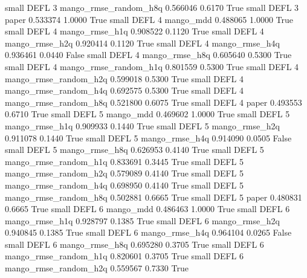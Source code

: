      small     DEFL                 3 mango_rmse_random_h8q   0.566046      0.6170    True
     small     DEFL                 3                 paper   0.533374      1.0000    True
     small     DEFL                 4             mango_mdd   0.488065      1.0000    True
     small     DEFL                 4        mango_rmse_h1q   0.908522      0.1120    True
     small     DEFL                 4        mango_rmse_h2q   0.920414      0.1120    True
     small     DEFL                 4        mango_rmse_h4q   0.936461      0.0440   False
     small     DEFL                 4        mango_rmse_h8q   0.605640      0.5300    True
     small     DEFL                 4 mango_rmse_random_h1q   0.801559      0.5300    True
     small     DEFL                 4 mango_rmse_random_h2q   0.599018      0.5300    True
     small     DEFL                 4 mango_rmse_random_h4q   0.692575      0.5300    True
     small     DEFL                 4 mango_rmse_random_h8q   0.521800      0.6075    True
     small     DEFL                 4                 paper   0.493553      0.6710    True
     small     DEFL                 5             mango_mdd   0.469602      1.0000    True
     small     DEFL                 5        mango_rmse_h1q   0.909933      0.1440    True
     small     DEFL                 5        mango_rmse_h2q   0.911078      0.1440    True
     small     DEFL                 5        mango_rmse_h4q   0.914090      0.0505   False
     small     DEFL                 5        mango_rmse_h8q   0.626953      0.4140    True
     small     DEFL                 5 mango_rmse_random_h1q   0.833691      0.3445    True
     small     DEFL                 5 mango_rmse_random_h2q   0.579089      0.4140    True
     small     DEFL                 5 mango_rmse_random_h4q   0.698950      0.4140    True
     small     DEFL                 5 mango_rmse_random_h8q   0.502881      0.6665    True
     small     DEFL                 5                 paper   0.480831      0.6665    True
     small     DEFL                 6             mango_mdd   0.486463      1.0000    True
     small     DEFL                 6        mango_rmse_h1q   0.928797      0.1385    True
     small     DEFL                 6        mango_rmse_h2q   0.940845      0.1385    True
     small     DEFL                 6        mango_rmse_h4q   0.964104      0.0265   False
     small     DEFL                 6        mango_rmse_h8q   0.695280      0.3705    True
     small     DEFL                 6 mango_rmse_random_h1q   0.820601      0.3705    True
     small     DEFL                 6 mango_rmse_random_h2q   0.559567      0.7330    True

